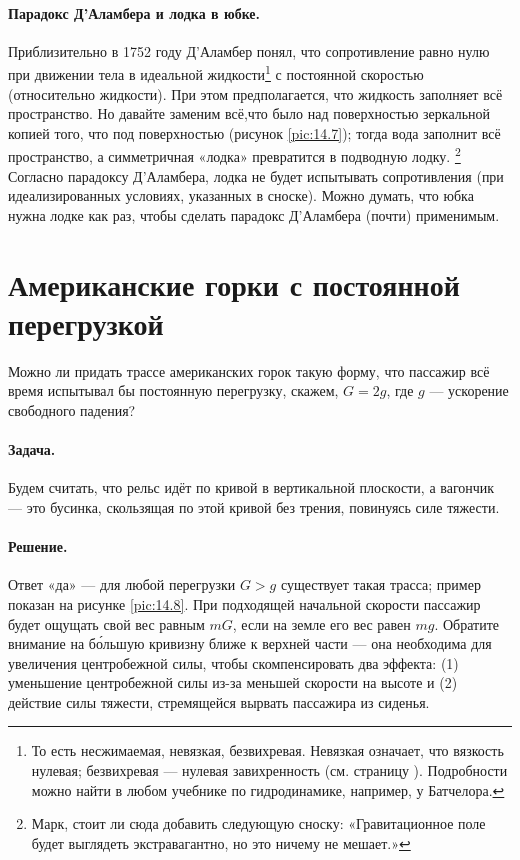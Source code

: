 \paragraph{Парадокс Д’Аламбера и лодка в юбке.}
Приблизительно в 1752 году Д’Аламбер понял,
что сопротивление равно нулю при движении тела в идеальной жидкости\footnote{То есть несжимаемая, невязкая, безвихревая.
Невязкая означает, что вязкость нулевая;
безвихревая --- нулевая завихренность (см. страницу \pageref{def:завихренность}).
Подробности можно найти в любом учебнике по гидродинамике, например, у Батчелора.}
с постоянной скоростью (относительно жидкости).
При этом предполагается, что жидкость заполняет всё пространство.
Но давайте заменим всё,что было над поверхностью зеркальной копией того, что под поверхностью (рисунок \ref{pic:14.7});
тогда вода заполнит всё пространство, а симметричная «лодка» превратится в подводную лодку.%
\footnote{Марк, стоит ли сюда добавить следующую сноску: «Гравитационное поле будет выглядеть экстравагантно, но это ничему не мешает.» \pr}
Согласно парадоксу Д’Аламбера, лодка не будет испытывать сопротивления (при идеализированных условиях, указанных в сноске).
Можно думать, что юбка нужна лодке как раз, чтобы сделать парадокс Д’Аламбера (почти) применимым.

\section{Американские горки с постоянной перегрузкой}\label{Американские горки с постоянной перегрузкой}

Можно ли придать трассе американских горок такую форму, что пассажир всё время испытывал бы постоянную перегрузку, скажем, $G=2g$, где $g$ --- ускорение свободного падения?

\paragraph{Задача.}
Будем считать, что рельс идёт по кривой в вертикальной плоскости, а вагончик --- это бусинка, скользящая по этой кривой без трения, повинуясь силе тяжести.

\paragraph{Решение.}
Ответ «да» ---
для любой перегрузки $G>g$ существует такая трасса; пример показан на рисунке \ref{pic:14.8}.
При подходящей начальной скорости пассажир будет ощущать свой вес равным $mG$, если на земле его вес равен $mg$.
Обратите внимание на б\'{о}льшую кривизну ближе к верхней части --- она необходима для увеличения центробежной силы, чтобы скомпенсировать два эффекта: (1) уменьшение центробежной силы из-за меньшей скорости на высоте и (2) действие силы тяжести, стремящейся вырвать пассажира из сиденья.

